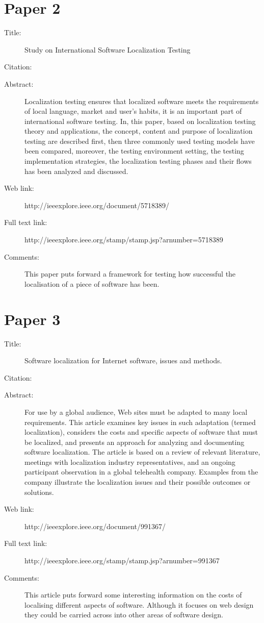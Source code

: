 \documentclass{scrartcl}
\begin{document}
\section*{Paper 2}
\begin{description}
\item[Title:] Study on International Software Localization Testing
\item[Citation:] \cite{zhao2010study}
\item[Abstract:]Localization testing ensures that localized software meets the requirements of local language, market and user’s habits, it is an important part of international software testing. In, this paper, based on localization testing theory and applications, the concept, content and purpose of localization testing are described first, then three commonly used testing models have been compared, moreover, the testing environment setting, the testing implementation strategies, the localization testing phases and their flows has been analyzed and discussed.
\item[Web link:] http://ieeexplore.ieee.org/document/5718389/
\item[Full text link:] http://ieeexplore.ieee.org/stamp/stamp.jsp?arnumber=5718389
\item[Comments:] This paper puts forward a framework for testing how successful the localisation of a piece of software has been.
\end{description}

\section*{Paper 3}
\begin{description}
\item[Title:]Software localization for Internet software, issues and methods.
\item[Citation:] \cite{collins2002software}
\item[Abstract:] For use by a global audience, Web sites must be adapted to many local requirements. This article examines key issues in such adaptation (termed localization), considers the costs and specific aspects of software that must be localized, and presents an approach for analyzing and documenting software localization. The article is based on a review of relevant literature, meetings with localization industry representatives, and an ongoing participant observation in a global telehealth company. Examples from the company illustrate the localization issues and their possible outcomes or solutions.
\item[Web link:]http://ieeexplore.ieee.org/document/991367/
\item[Full text link:] http://ieeexplore.ieee.org/stamp/stamp.jsp?arnumber=991367
\item[Comments:] This article puts forward some interesting information on the costs of localising different aspects of software. Although it focuses on web design they could be carried across into other areas of software design. 
\end{description}
\end{document}
